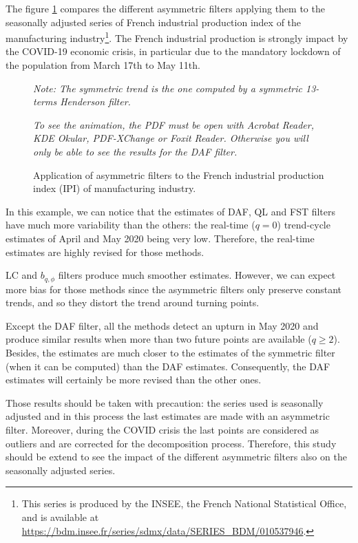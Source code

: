 \documentclass[
  12pt,
  ,
  a4paper]{article}
\begin{document}
The figure \ref{fig:ipi} compares the different asymmetric filters applying them to the seasonally adjusted series of French industrial production index of the manufacturing industry\footnote{This series is produced by the INSEE, the French National Statistical Office, and is available at \url{https://bdm.insee.fr/series/sdmx/data/SERIES_BDM/010537946}.}.
The French industrial production is strongly impact by the COVID-19 economic crisis, in particular due to the mandatory lockdown of the population from March 17th to May 11th.

\begin{figure}[!ht]
\caption{Application of asymmetric filters to the French industrial production index (IPI) of manufacturing industry.}\label{fig:ipi}\footnotesize
\emph{Note: The symmetric trend is the one computed by a symmetric 13-terms Henderson filter.}

\emph{To see the animation, the PDF must be open with Acrobat Reader, KDE Okular, PDF-XChange or Foxit Reader.
Otherwise you will only be able to see the results for the DAF filter.}
\end{figure}

In this example, we can notice that the estimates of DAF, QL and FST filters have much more variability than the others: the real-time (\(q=0\)) trend-cycle estimates of April and May 2020 being very low.
Therefore, the real-time estimates are highly revised for those methods.

LC and \(b_{q,\phi}\) filters produce much smoother estimates.
However, we can expect more bias for those methods since the asymmetric filters only preserve constant trends, and so they distort the trend around turning points.

Except the DAF filter, all the methods detect an upturn in May 2020 and produce similar results when more than two future points are available (\(q\geq 2\)).
Besides, the estimates are much closer to the estimates of the symmetric filter (when it can be computed) than the DAF estimates.
Consequently, the DAF estimates will certainly be more revised than the other ones.

Those results should be taken with precaution: the series used is seasonally adjusted and in this process the last estimates are made with an asymmetric filter.
Moreover, during the COVID crisis the last points are considered as outliers and are corrected for the decomposition process.
Therefore, this study should be extend to see the impact of the different asymmetric filters also on the seasonally adjusted series.
\end{document}
